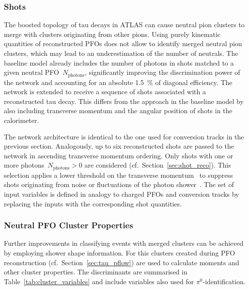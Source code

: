 \subsubsection{Shots}

The boosted topology of tau decays in ATLAS can cause neutral pion clusters to
merge with clusters originating from other pions. Using purely kinematic
quantities of reconstructed PFOs does not allow to identify merged neutral pion
clusters, which may lead to an underestimation of the number of neutrals. The
baseline model already includes the number of photons in shots matched to a
given neutral PFO~$N_\text{photons}$, significantly improving the discrimination
power of the network and accounting for an absolute \SI{1.5}{\percent} of
diagonal efficiency. The network is extended to receive a sequence of shots
associated with a reconstructed tau decay. This differs from the approach in the
baseline model by also including transverse momentum and the angular position of
shots in the calorimeter.

The network architecture is identical to the one used for conversion tracks in
the previous section. Analogously, up to six reconstructed shots are passed to
the network in ascending transverse momentum ordering. Only shots with one or
more photons~$N_\text{photons} > 0$ are considered (cf.\
Section~\ref{sec:shot_reco}). This selection applies a lower threshold on the
transverse momentum~\smash{$p_\text{T}^\text{shot}$} to suppress shots
originating from noise or fluctuations of the photon
shower~\cite{atlas:taurec:decaymodes}.
The set of input variables is defined in analogy to charged PFOs and conversion
tracks by replacing the inputs with the corresponding shot quantities.

\subsubsection{Neutral PFO Cluster Properties}

Further improvements in classifying events with merged clusters can be achieved
by employing shower shape information. For this clusters created during PFO
reconstruction (cf.\ Section~\ref{sec:tau_pflow}) are used to calculate moments
and other cluster properties.
The discriminants are summarised in Table~\ref{tab:cluster_variables} and
include variables also used for $\pi^0$-identification.

